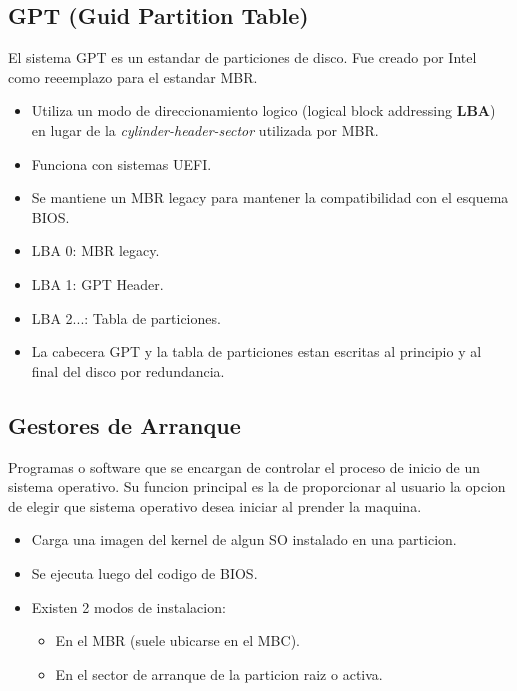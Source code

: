 \documentclass[11pt]{article}
\begin{document}
\begin{itemize}
        \subsection{GPT (Guid Partition Table)}
        El sistema GPT es un estandar de particiones de disco. Fue creado por Intel como reeemplazo para el estandar MBR.
        \begin{itemize}
            \item Utiliza un modo de direccionamiento logico (logical block addressing \textbf{LBA}) en lugar de la \textit{cylinder-header-sector} utilizada por MBR.
            \item Funciona con sistemas UEFI.
            \item Se mantiene un MBR legacy para mantener la compatibilidad con el esquema BIOS.
            \item LBA 0: MBR legacy.
            \item LBA 1: GPT Header.
            \item LBA 2...: Tabla de particiones.
            \item La cabecera GPT y la tabla de particiones estan escritas al principio y al final del disco por redundancia.
        \end{itemize}

        \subsection{Gestores de Arranque}
        Programas o software que se encargan de controlar el proceso de inicio de un sistema operativo. Su funcion principal es la de proporcionar al usuario la opcion de elegir que sistema operativo desea iniciar al prender la maquina.
        \begin{itemize}
            \item Carga una imagen del kernel de algun SO instalado en una particion.
            \item Se ejecuta luego del codigo de BIOS.
            \item Existen 2 modos de instalacion:
                \begin{itemize}
                    \item En el MBR (suele ubicarse en el MBC).
                    \item En el sector de arranque de la particion raiz o activa.
                \end{itemize}
        \end{itemize}

\end{itemize}
\end{document}
